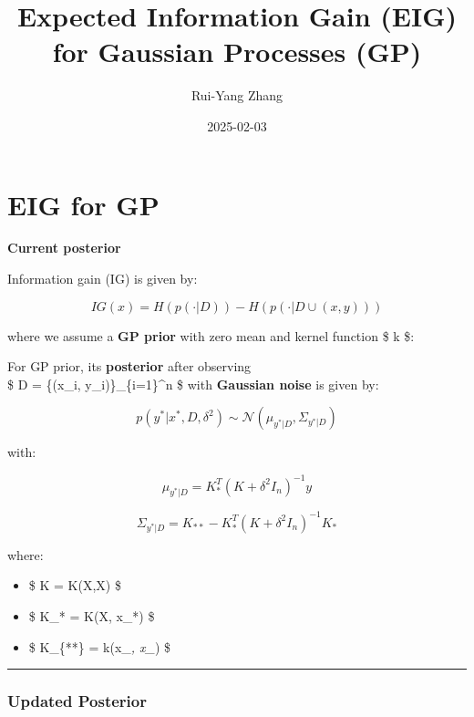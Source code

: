 \documentclass[
  letterpaper,
  DIV=11,
  numbers=noendperiod]{scrartcl}
\title{Expected Information Gain (EIG) for Gaussian Processes (GP)}
\author{Rui-Yang Zhang}
\date{2025-02-03}
\providecommand{\tightlist}{%
  \setlength{\itemsep}{0pt}\setlength{\parskip}{0pt}}\usepackage{longtable,booktabs,array}
\begin{document}
\maketitle
\ifdefined\Shaded\renewenvironment{Shaded}{\begin{tcolorbox}[enhanced, borderline west={3pt}{0pt}{shadecolor}, frame hidden, boxrule=0pt, breakable, interior hidden, sharp corners]}{\end{tcolorbox}}\fi

\hypertarget{eig-for-gp}{%
\section{EIG for GP}\label{eig-for-gp}}

\textbf{Current posterior}

Information gain (IG) is given by:

\[
IG(x) = H(p(\cdot | D)) - H(p(\cdot | D \cup (x,y)))
\]

where we assume a \textbf{GP prior} with zero mean and kernel function
\$ k \$:

For GP prior, its \textbf{posterior} after observing\\
\$ D = \{(x\_i, y\_i)\}\_\{i=1\}\^{}n \$ with \textbf{Gaussian noise} is
given by:

\[
p(y^* | x^*, D, \delta^2) \sim \mathcal{N}(\mu_{y^*|D}, \Sigma_{y^*|D})
\]

with:

\[
\mu_{y^*|D} = K_*^T (K + \delta^2 I_n)^{-1} y
\]

\[
\Sigma_{y^*|D} = K_{**} - K_*^T (K + \delta^2 I_n)^{-1} K_*
\]

where:

\begin{itemize}
\tightlist
\item
  \$ K = K(X,X) \$
\item
  \$ K\_* = K(X, x\_*) \$
\item
  \$ K\_\{**\} = k(x\_\emph{, x\_}) \$
\end{itemize}

\begin{center}\rule{0.5\linewidth}{0.5pt}\end{center}

\hypertarget{updated-posterior}{%
\subsubsection{Updated Posterior}\label{updated-posterior}}
\end{document}
